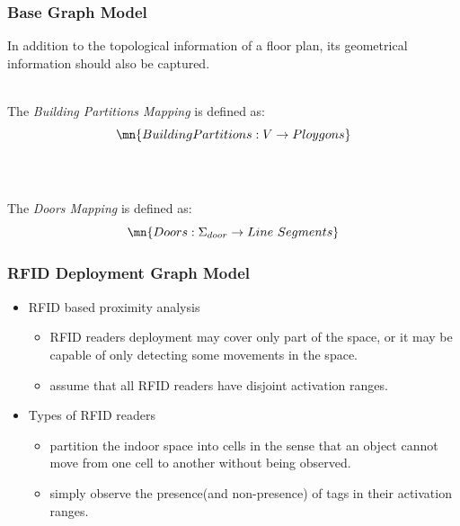 
\begin{frame}
\frametitle{Base Graph Model}

  \small{In addition to the topological information of a floor plan, its geometrical information should also be captured.}
  \\~\\
  \pause

  The \textrm{\em Building Partitions Mapping} is defined as:
  \pause
  \begin{equation}
  \mn{BuildingPartitions: V \rightarrow Ploygons}
  \end{equation}
  \\~\\
  \pause

  The \textrm{\em Doors Mapping} is defined as:
  \pause
  \begin{equation}
  \mn{Doors: \Sigma_{door} \rightarrow Line~Segments}
  \end{equation}

\end{frame}



\begin{frame}
\frametitle{RFID Deployment Graph Model}

\begin{itemize}
  \item RFID based proximity analysis
      \begin{itemize}
        \item RFID readers deployment may cover only part of the space, or it may be capable of only detecting some movements in the space.
        \item assume that all RFID readers have disjoint activation ranges.
      \end{itemize}
  \item Types of RFID readers
      \begin{itemize}
        \item {} partition the indoor space into cells in the sense that an object cannot move from one cell to another without being observed.
        \item {} simply observe the presence(and non-presence) of tags in their activation ranges.
      \end{itemize}
\end{itemize}

\end{frame}

